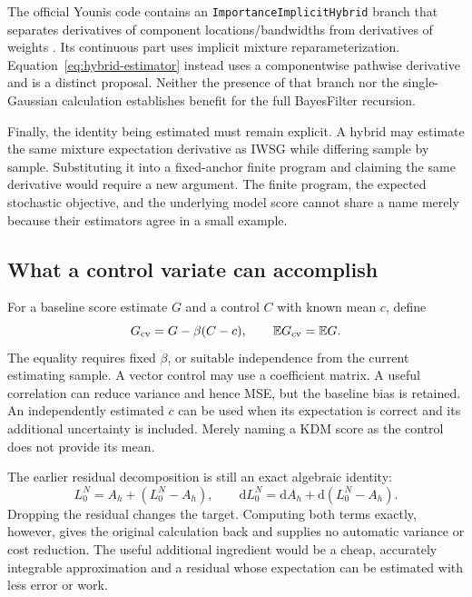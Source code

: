 \documentclass[11pt]{article}
\newcommand{\dd}{\mathrm{d}}
\begin{document}
The official Younis code contains an
\texttt{ImportanceImplicitHybrid} branch that separates derivatives of
component locations/bandwidths from derivatives of weights
\citep{youniscode2023}. Its continuous part uses implicit mixture
reparameterization. Equation~\eqref{eq:hybrid-estimator} instead uses a
componentwise pathwise derivative and is a distinct proposal. Neither the
presence of that branch nor the single-Gaussian calculation establishes
benefit for the full BayesFilter recursion.

Finally, the identity being estimated must remain explicit. A hybrid may
estimate the same mixture expectation derivative as IWSG while differing
sample by sample. Substituting it into a fixed-anchor finite program and
claiming the same derivative would require a new argument. The finite
program, the expected stochastic objective, and the underlying model score
cannot share a name merely because their estimators agree in a small example.

\subsection{What a control variate can accomplish}

For a baseline score estimate $G$ and a control $C$ with known mean $c$, define
\begin{equation}
 G_{\rm cv}=G-\beta(C-c),\qquad
 \mathbb E G_{\rm cv}=\mathbb E G.
 \label{eq:score-control-variate}
\end{equation}
The equality requires fixed $\beta$, or suitable independence from the
current estimating sample. A vector control may use a coefficient matrix.
A useful correlation can reduce variance and hence MSE, but the baseline
bias is retained. An independently estimated $c$ can be used when its
expectation is correct and its additional uncertainty is included. Merely
naming a KDM score as the control does not provide its mean.

The earlier residual decomposition is still an exact algebraic identity:
\begin{equation}
 L_0^N=A_h+\left(L_0^N-A_h\right),\qquad
 \dd L_0^N=\dd A_h+\dd\left(L_0^N-A_h\right).
 \label{eq:residual}
\end{equation}
Dropping the residual changes the target. Computing both terms exactly,
however, gives the original calculation back and supplies no automatic
variance or cost reduction. The useful additional ingredient would be a
cheap, accurately integrable approximation and a residual whose expectation
can be estimated with less error or work.
\end{document}

